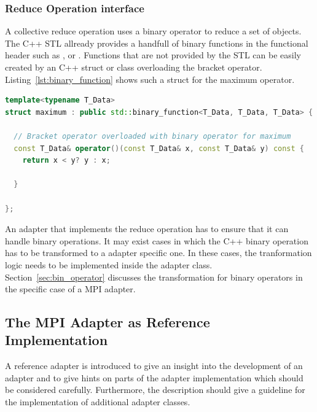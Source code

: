 \subsubsection{Reduce Operation interface}
A collective reduce operation uses a binary operator to reduce a set
of objects. The C++ STL allready provides a handfull of binary
functions in the functional header such as ,
 or 
\cite{ref:functional}. Functions that are not provided by the STL can
be easily created by an C++ struct or class overloading the bracket
operator. Listing~\ref{lst:binary_function} shows such a struct for
the maximum operator.

\begin{lstlisting}[language=C++, breaklines=false, label={lst:binary_function}]
template<typename T_Data>
struct maximum : public std::binary_function<T_Data, T_Data, T_Data> {

  // Bracket operator overloaded with binary operator for maximum
  const T_Data& operator()(const T_Data& x, const T_Data& y) const {
    return x < y? y : x;

  }

};
\end{lstlisting}

An adapter that implements the reduce operation has to ensure that it
can handle binary operations.  It may exist cases in which the C++
binary operation has to be transformed to a adapter specific one.  In
these cases, the tranformation logic needs to be implemented inside the
adapter class.  Section~\ref{sec:bin_operator} discusses the
transformation for binary operators in the specific case of a MPI
adapter.

\subsection{The MPI Adapter as Reference Implementation}
\label{sec:cal_mpi_adapter}

A reference adapter is introduced to give an insight into the
development of an adapter and to give hints on parts of the adapter
implementation which should be considered carefully. Furthermore, the
description should give a guideline for the implementation of
additional adapter classes.


